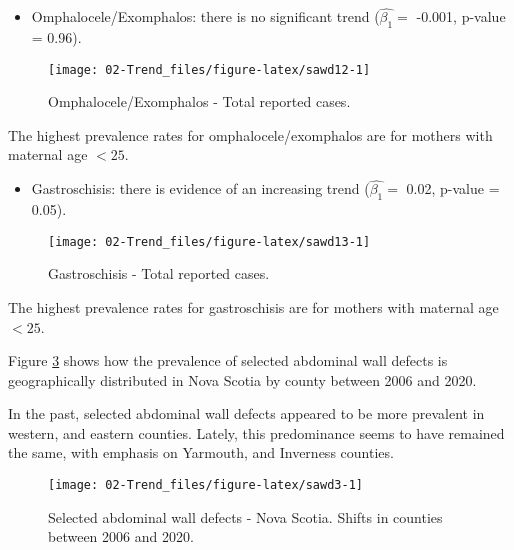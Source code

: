 \documentclass[
]{krantz}
\providecommand{\tightlist}{%
  \setlength{\itemsep}{0pt}\setlength{\parskip}{0pt}}
\begin{document}
\begin{itemize}
\tightlist
\item
  Omphalocele/Exomphalos: there is no significant trend (\(\hat{\beta_{1}} =\) -0.001, p-value = 0.96).
\end{itemize}

\begin{figure}[h]

{\centering \texttt{[image: 02-Trend\_files/figure-latex/sawd12-1]} 

}

\caption{Omphalocele/Exomphalos - Total reported cases.}\label{fig:sawd12}
\end{figure}

The highest prevalence rates for omphalocele/exomphalos are for mothers with maternal age \(< 25\).

\begin{itemize}
\tightlist
\item
  Gastroschisis: there is evidence of an increasing trend (\(\hat{\beta_{1}} =\) 0.02, p-value = 0.05).
\end{itemize}

\begin{figure}[h]

{\centering \texttt{[image: 02-Trend\_files/figure-latex/sawd13-1]} 

}

\caption{Gastroschisis - Total reported cases.}\label{fig:sawd13}
\end{figure}

The highest prevalence rates for gastroschisis are for mothers with maternal age \(< 25\).

Figure \ref{fig:sawd3} shows how the prevalence of selected abdominal wall defects is geographically distributed in Nova Scotia by county between 2006 and 2020.

In the past, selected abdominal wall defects appeared to be more prevalent in western, and eastern counties. Lately, this predominance seems to have remained the same, with emphasis on Yarmouth, and Inverness counties.

\begin{figure}[h]

{\centering \texttt{[image: 02-Trend\_files/figure-latex/sawd3-1]} 

}

\caption{Selected abdominal wall defects - Nova Scotia. Shifts in counties between 2006 and 2020.}\label{fig:sawd3}
\end{figure}
\end{document}
